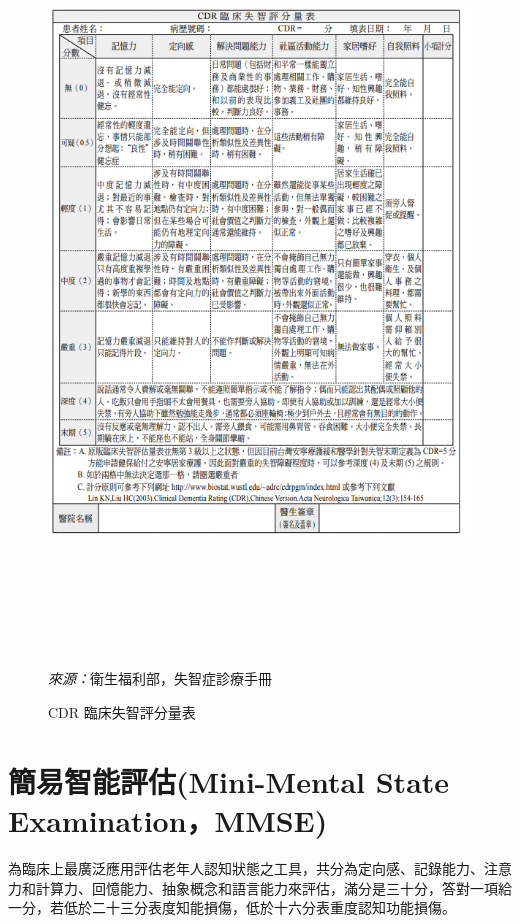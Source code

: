 \begin{figure}[H]
	\centering
	\centerline{\includegraphics[height=20cm]{pic/CDR.PNG}}
	\caption{CDR 臨床失智評分量表}
	\begin{minipage}{.7\linewidth}

		\footnotesize
		\emph{來源：}衛生福利部，失智症診療手冊

	\end{minipage}
	\label{fig:CDR}
\end{figure}

\section{簡易智能評估(Mini-Mental State Examination，MMSE)}
為臨床上最廣泛應用評估老年人認知狀態之工具，共分為定向感、記錄能力、注意力和計算力、回憶能力、抽象概念和語言能力來評估，滿分是三十分，答對一項給一分，若低於二十三分表度知能損傷，低於十六分表重度認知功能損傷。


